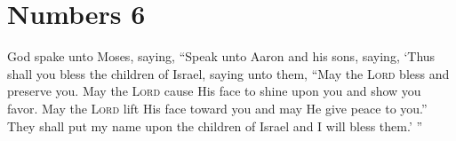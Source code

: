 \section{Numbers 6}\label{Numbers 6}
\begin{enumerate}
     God spake unto Moses, saying,%
     ``Speak unto Aaron and his sons, saying, `Thus shall you bless the children of Israel, saying unto them,%
     ``May the \textsc{Lord} bless and preserve you.%
     May the \textsc{Lord} cause His face to shine upon you and show you favor.%
     May the \textsc{Lord} lift His face toward you and may He give peace to you.''%
     They shall put my name upon the children of Israel and I will bless them.' ''%
\end{enumerate}
